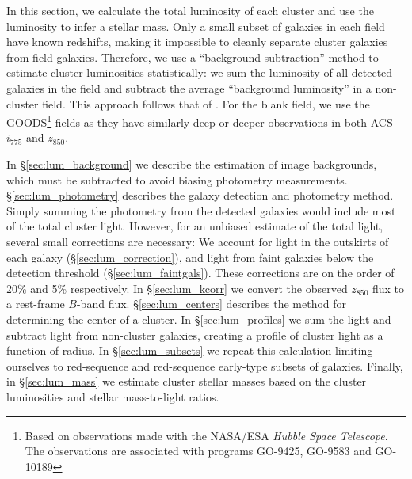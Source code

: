 
In this section, we calculate the total luminosity of each cluster and
use the luminosity to infer a stellar mass. Only a small subset of
galaxies in each field have known redshifts, making it impossible to
cleanly separate cluster galaxies from field galaxies.  Therefore, we
use a ``background subtraction'' method to estimate cluster
luminosities statistically: we sum the luminosity of all detected
galaxies in the field and subtract the average ``background
luminosity'' in a non-cluster field.  This approach follows that
of \citet{sharon07a}.  For the blank field, we use the
GOODS\footnote{Based on observations made with the NASA/ESA 
\emph{Hubble Space Telescope}. The observations are associated with programs
GO-9425, GO-9583 and GO-10189} \citep{giavalisco04a} fields as they
have similarly deep or deeper observations in both ACS $i_{775}$ and
$z_{850}$.

In \S\ref{sec:lum_background} we describe the estimation of image
backgrounds, which must be subtracted to avoid biasing photometry
measurements. \S\ref{sec:lum_photometry} describes the galaxy
detection and photometry method.  Simply summing the photometry from
the detected galaxies would include most of the total cluster
light. However, for an unbiased estimate of the total light, several
small corrections are necessary: We account for light in the outskirts
of each galaxy (\S\ref{sec:lum_correction}), and light from faint
galaxies below the detection threshold
(\S\ref{sec:lum_faintgals}). These corrections are on the order of
20\% and 5\% respectively. In \S\ref{sec:lum_kcorr} we convert the
observed $z_{850}$ flux to a rest-frame $B$-band
flux. \S\ref{sec:lum_centers} describes the method for determining the
center of a cluster. In \S\ref{sec:lum_profiles} we sum the light and
subtract light from non-cluster galaxies, creating a profile of
cluster light as a function of radius. In \S\ref{sec:lum_subsets} we
repeat this calculation limiting ourselves to red-sequence and
red-sequence early-type subsets of galaxies. Finally,
in \S\ref{sec:lum_mass} we estimate cluster stellar masses based on
the cluster luminosities and stellar mass-to-light ratios.
